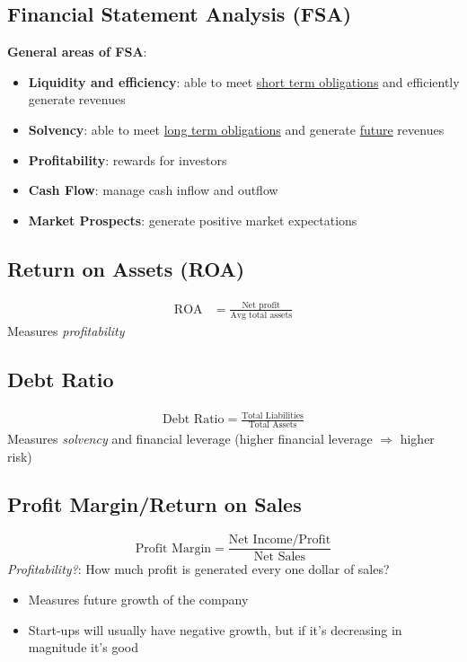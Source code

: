 \documentclass{article}
\begin{document}
\begin{multicols}{2}
\section{Financial Statement Analysis (FSA)}
\textbf{General areas of FSA}:
\begin{itemize}
	\item \textbf{Liquidity and efficiency}: able to meet \underline{short term obligations} and efficiently generate revenues
	\item \textbf{Solvency}: able to meet \underline{long term obligations} and generate \underline{future} revenues
	\item \textbf{Profitability}: rewards for investors
	\item \textbf{Cash Flow}: manage cash inflow and outflow
	\item \textbf{Market Prospects}: generate positive market expectations
\end{itemize}


\subsection{Return on Assets (ROA)}
\begin{equation*}
	\begin{aligned}
		\text{ROA} &= \frac{\text{Net profit}}{\text{Avg total assets}}
	\end{aligned}
\end{equation*}
Measures \textit{profitability}
\subsection{Debt Ratio}
\begin{equation*}
	\begin{aligned}
		\text{Debt Ratio} = \frac{\text{Total Liabilities}}{\text{Total Assets}}
	\end{aligned}
\end{equation*}
Measures \textit{solvency} and financial leverage (higher financial leverage $\Rightarrow$ higher risk)
\subsection{Profit Margin/Return on Sales}
$$\text{Profit Margin} = \frac{\text{Net Income/Profit}}{\text{Net Sales}}$$
\textit{Profitability?}: How much profit is generated every one dollar of sales?
\begin{itemize}
	\item Measures future growth of the company
	\item Start-ups will usually have negative growth, but if it's decreasing in magnitude it's good
\end{itemize}


\end{multicols}
\end{document}
